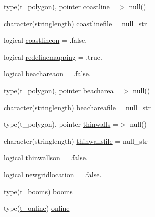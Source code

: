 \begin{DoxyCompactItemize}
\item 
type(t\+\_\+polygon), pointer \mbox{\hyperlink{structmodulelagrangianglobal_1_1t__lagrangian_a55df7c10c0f14b3cdc3e24ae6c68a40f}{coastline}} =$>$ null()
\item 
character(stringlength) \mbox{\hyperlink{structmodulelagrangianglobal_1_1t__lagrangian_a642518287edff2bb4bac9b7a7259d657}{coastlinefile}} = null\+\_\+str
\item 
logical \mbox{\hyperlink{structmodulelagrangianglobal_1_1t__lagrangian_a633a512ee17517334cfd164050948fb2}{coastlineon}} = .false.
\item 
logical \mbox{\hyperlink{structmodulelagrangianglobal_1_1t__lagrangian_a458ffd72ba29b667627ea022f754ab25}{redefinemapping}} = .true.
\item 
logical \mbox{\hyperlink{structmodulelagrangianglobal_1_1t__lagrangian_a34512b9677ba751b4353dd3c155b652c}{beachareaon}} = .false.
\item 
type(t\+\_\+polygon), pointer \mbox{\hyperlink{structmodulelagrangianglobal_1_1t__lagrangian_af2ea4cf180c3e0e774128f718277daf8}{beacharea}} =$>$ null()
\item 
character(stringlength) \mbox{\hyperlink{structmodulelagrangianglobal_1_1t__lagrangian_a8cfa7db30c71b0a55101c13720edf30e}{beachareafile}} = null\+\_\+str
\item 
type(t\+\_\+polygon), pointer \mbox{\hyperlink{structmodulelagrangianglobal_1_1t__lagrangian_aa984e844849bc2da7e62f80b030a16ab}{thinwalls}} =$>$ null()
\item 
character(stringlength) \mbox{\hyperlink{structmodulelagrangianglobal_1_1t__lagrangian_a2e24ea695feb1594e57f47ec3ff7c8e6}{thinwallsfile}} = null\+\_\+str
\item 
logical \mbox{\hyperlink{structmodulelagrangianglobal_1_1t__lagrangian_a17e047ab9665cea49ff0b177d7440135}{thinwallson}} = .false.
\item 
logical \mbox{\hyperlink{structmodulelagrangianglobal_1_1t__lagrangian_a3e9ffdeaa2a3f20fb9ee7bcdc13ef7af}{newgridlocation}} = .false.
\item 
type(\mbox{\hyperlink{structmodulelagrangianglobal_1_1t__booms}{t\+\_\+booms}}) \mbox{\hyperlink{structmodulelagrangianglobal_1_1t__lagrangian_ad4118c03eaf361343a82647fb3cb3bc7}{booms}}
\item 
type(\mbox{\hyperlink{structmodulelagrangianglobal_1_1t__online}{t\+\_\+online}}) \mbox{\hyperlink{structmodulelagrangianglobal_1_1t__lagrangian_a22cd2ed8eb7b9d150096908d5681f983}{online}}
\item 

\end{DoxyCompactItemize}
